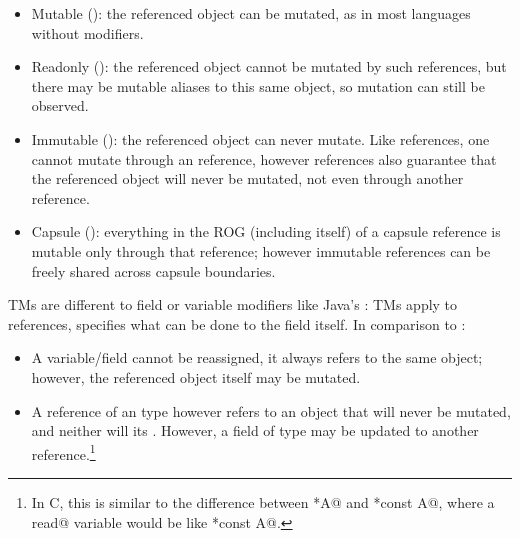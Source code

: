\begin{itemize}
\item Mutable (\Q@mut@): the referenced object can be mutated, as in most languages without modifiers.
\item Readonly (\Q@read@): the referenced object cannot be mutated by such references, but there may be mutable aliases to this same object, so mutation can still be observed. 
\item Immutable (\Q@imm@): the referenced object can never mutate. Like \Q@read@ references, one cannot mutate through an \Q@imm@ reference, however \Q@imm@ references also guarantee that the referenced object will never be mutated, not even through another reference.
\item Capsule (\Q@capsule@):
 everything in the ROG (including itself) of a capsule reference is mutable only through that reference; however immutable references can be freely shared across capsule boundaries.
\end{itemize}
TMs are different to field or variable modifiers like Java’s \Q@final@: TMs apply to references,  \Q@final@ specifies what can be done to the field itself. In comparison to \Q@imm@:

\begin{itemize}
\item A \Q@final@ variable/field cannot be reassigned, it always refers to the same object; however, the referenced object itself may be mutated.
\item A reference of an \Q@imm@ type however refers to an object that will never be mutated, and neither will its . However, a field of type \Q@imm@ may be updated to another \Q@imm@ reference.\footnote{In C, this is similar to the difference between \Q@const *A@ and \Q@*const A@, where a \Q@final read@ variable would be like \Q@const *const A@.}
\end{itemize}



